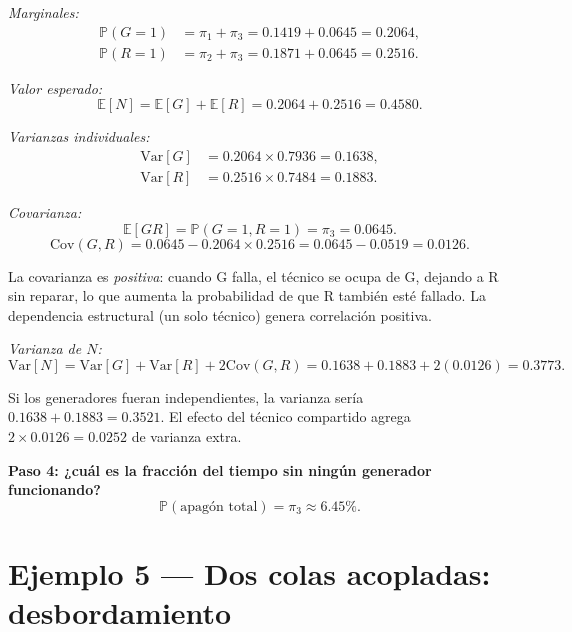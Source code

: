\documentclass[11pt,a4paper]{article}
\theoremstyle{definition}
\theoremstyle{remark}
\newcommand{\E}{\mathbb{E}}
\newcommand{\Var}{\mathrm{Var}}
\newcommand{\Cov}{\mathrm{Cov}}
\newcommand{\Prob}{\mathbb{P}}
\begin{document}
\begin{ejemplo}
\emph{Marginales:}
\begin{align*}
  \Prob(G=1) &= \pi_1+\pi_3 = 0.1419+0.0645 = 0.2064, \\
  \Prob(R=1) &= \pi_2+\pi_3 = 0.1871+0.0645 = 0.2516.
\end{align*}

\emph{Valor esperado:}
\[
  \E[N] = \E[G]+\E[R] = 0.2064+0.2516 = 0.4580.
\]

\emph{Varianzas individuales:}
\begin{align*}
  \Var[G] &= 0.2064\times 0.7936 = 0.1638, \\
  \Var[R] &= 0.2516\times 0.7484 = 0.1883.
\end{align*}

\emph{Covarianza:}
\[
  \E[GR] = \Prob(G=1,R=1) = \pi_3 = 0.0645.
\]
\[
  \Cov(G,R) = 0.0645 - 0.2064\times 0.2516 = 0.0645 - 0.0519 = 0.0126.
\]

La covarianza es \emph{positiva}: cuando G falla, el técnico se ocupa de
G, dejando a R sin reparar, lo que aumenta la probabilidad de que R
también esté fallado.  La dependencia estructural (un solo técnico)
genera correlación positiva.

\emph{Varianza de $N$:}
\[
  \Var[N] = \Var[G]+\Var[R]+2\Cov(G,R)
  = 0.1638+0.1883+2(0.0126) = 0.3773.
\]

Si los generadores fueran independientes, la varianza sería
$0.1638+0.1883=0.3521$.  El efecto del técnico compartido agrega
$2\times 0.0126 = 0.0252$ de varianza extra.

\textbf{Paso 4: ¿cuál es la fracción del tiempo sin ningún generador
funcionando?}
\[
  \Prob(\text{apagón total}) = \pi_3 \approx 6.45\%.
\]
\end{ejemplo}

\section{Ejemplo 5 --- Dos colas acopladas: desbordamiento}
\end{document}
